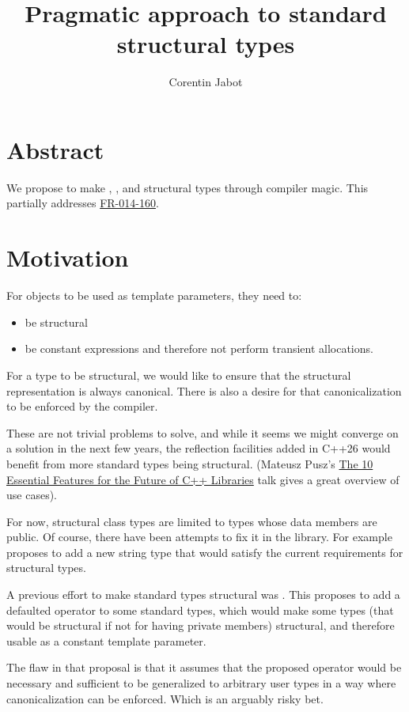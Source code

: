 \documentclass{wg21}
\title{Pragmatic approach to standard structural types}
\author{Corentin Jabot}{corentin.jabot@gmail.com}
\begin{document}
\maketitle

\section{Abstract}

We propose to make , , and  structural types through compiler magic.
This partially addresses \href{https://github.com/cplusplus/nbballot/issues/740}{FR-014-160}.

\section{Motivation}

For objects to be used as template parameters, they need to:
\begin{itemize}
\item be structural
\item be constant expressions and therefore not perform transient allocations.
\end{itemize}

For a type to be structural, we would like to ensure that the structural representation is always canonical.
There is also a desire for that canonicalization to be enforced by the compiler.

These are not trivial problems to solve, and while it seems we might converge on a solution in the next few years, the reflection facilities added in C++26 would benefit from more standard types being structural.
(Mateusz Pusz's \href{https://www.youtube.com/watch?v=TJg37Sh9j78}{The 10 Essential Features for the Future of C++ Libraries} talk gives a great overview of use cases).

For now, structural class types are limited to types whose data members are public.
Of course, there have been attempts to fix it in the library. For example 
proposes to add a new string type that would satisfy the current requirements for structural types.

A previous effort to make standard types structural was .
This proposes to add a defaulted operator to some standard types, which would make some types
(that would be structural if not for having private members) structural, and therefore usable as a constant template parameter.

The flaw in that proposal is that it assumes that the proposed operator would be necessary and sufficient to be generalized
to arbitrary user types in a way where canonicalization can be enforced. Which is an arguably risky bet.
\end{document}
